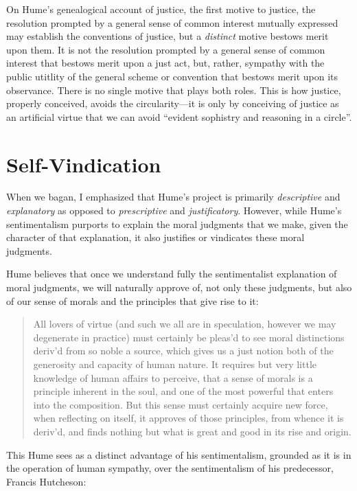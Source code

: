 On Hume's genealogical account of justice, the first motive to justice, the resolution prompted by a general sense of common interest mutually expressed may establish the conventions of justice, but a \emph{distinct} motive bestows merit upon them. It is not the resolution prompted by a general sense of common interest that bestows merit upon a just act, but, rather, sympathy with the public utitlity of the general scheme or convention that bestows merit upon its observance. There is no single motive that plays both roles. This is how justice, properly conceived, avoids the circularity---it is only by conceiving of justice as an artificial virtue that we can avoid ``evident sophistry and reasoning in a circle''.



\section{Self-Vindication}\label{sec:self_vindication} %

When we bagan, I emphasized that Hume's project is primarily \emph{descriptive} and \emph{explanatory} as opposed to \emph{prescriptive} and \emph{justificatory}. However, while Hume's sentimentalism purports to explain the moral judgments that we make, given the character of that explanation, it also justifies or vindicates these moral judgments.

Hume believes that once we understand fully the sentimentalist explanation of moral judgments, we will naturally approve of, not only these judgments, but also of our sense of morals and the principles that give rise to it:

\begin{quote}
	All lovers of virtue (and such we all are in speculation, however we may degenerate in practice) must certainly be pleas'd to see moral distinctions deriv'd from so noble a source, which gives us a just notion both of the generosity and capacity of human nature. It requires but very little knowledge of human affairs to perceive, that a sense of morals is a principle inherent in the soul, and one of the most powerful that enters into the composition. But this sense must certainly acquire new force, when reflecting on itself, it approves of those principles, from whence it is deriv'd, and finds nothing but what is great and good in its rise and origin.
\end{quote}

This Hume sees as a distinct advantage of his sentimentalism, grounded as it is in the operation of human sympathy, over the sentimentalism of his predecessor, Francis Hutcheson:

